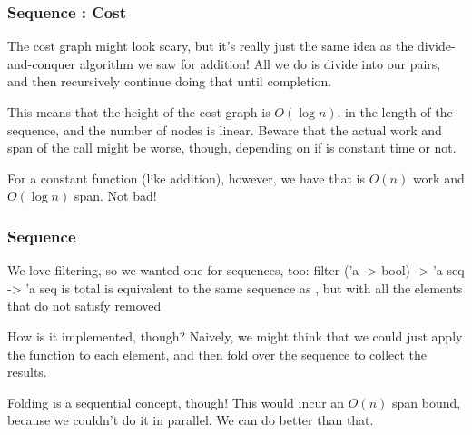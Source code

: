 \documentclass[aspectratio=169, handout]{beamer}
\begin{document}
\begin{frame}[fragile]
\begin{center}
  \end{center}
\end{frame}

\begin{frame}[fragile]
  \frametitle{Sequence : Cost}

  The cost graph might look scary, but it's really just the same idea as the
  divide-and-conquer algorithm we saw for addition! All we do is divide into
  our pairs, and then recursively continue doing that until completion.

  \pause
  \vspace{\fill}

  This means that the height of the cost graph is $O(\log n)$, in the length
  of the sequence, and the number of nodes is linear. Beware that the actual
  work and span of the  call might be worse, though, depending
  on if  is constant time or not.

  \pause
  \vspace{\fill}

  For a constant function  (like addition), however, we have that
   is $O(n)$ work and $O(\log n)$ span. Not bad!
\end{frame}

\begin{frame}[fragile]
  \frametitle{Sequence }

  We love filtering, so we wanted one for sequences, too:
  \pause
  \spec
    {filter}
    {('a -> bool) -> 'a seq -> 'a seq}
    { is total}
    { is equivalent to the same sequence as , but
    with all the elements that do not satisfy  removed}

  \pause
  How is it implemented, though? Naively, we might think that we could just
  apply the function  to each element, and then fold over the sequence
  to collect the results.

  \pause
  \vspace{\fill}

  Folding is a sequential concept, though! This would incur an $O(n)$ span
  bound, because we couldn't do it in parallel. We can do better than that.
\end{frame}
\end{document}

